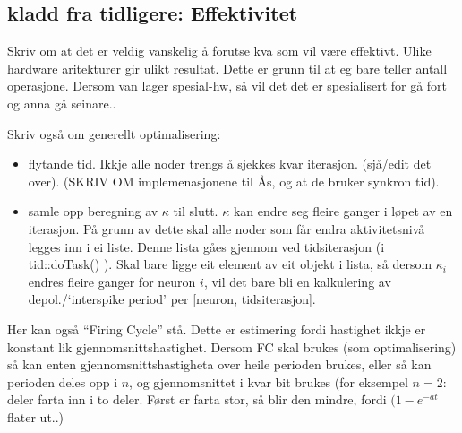 \subsection{kladd fra tidligere: Effektivitet}
Skriv om at det er veldig vanskelig å forutse kva som vil være effektivt. Ulike hardware aritekturer gir  ulikt resultat. Dette er grunn til at eg bare teller antall operasjone. Dersom van lager spesial-hw, så vil det det er spesialisert for gå fort og anna gå seinare..

Skriv også om generellt optimalisering:
\begin{itemize}
	\item flytande tid. Ikkje alle noder trengs å sjekkes kvar iterasjon. (sjå/edit det over). (SKRIV OM implemenasjonene til Ås, og at de bruker synkron tid).
	\item samle opp beregning av $\kappa$ til slutt. $\kappa$ kan endre seg fleire ganger i løpet av en iterasjon. På grunn av dette skal alle noder som får endra aktivitetsnivå legges inn i ei liste. Denne lista gåes gjennom ved tidsiterasjon (i tid::doTask() ). Skal bare ligge eit element av eit objekt i lista, så dersom $\kappa_i$ endres fleire ganger for neuron $i$, vil det bare bli en kalkulering av depol./`interspike period' per [neuron, tidsiterasjon].
\end{itemize}

Her kan også ``Firing Cycle'' stå. Dette er estimering fordi hastighet ikkje er konstant lik gjennomsnittshastighet. Dersom FC skal brukes (som optimalisering) så kan enten gjennomsnittshastigheta over heile perioden brukes, eller så kan perioden deles opp i $n$, og gjennomsnittet i kvar bit brukes (for eksempel $n=2$: deler farta inn i to deler. Først er farta stor, så blir den mindre, fordi $(1-e^{-at}$ flater ut..)




